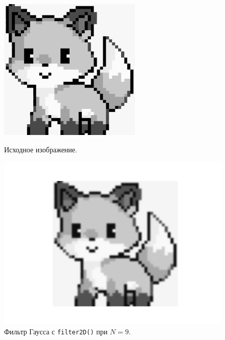 \documentclass[a4paper]{article}
\begin{document}
\begin{figure}[H]
  \centering
  \begin{minipage}{0.49\textwidth}
    \centering
    \includegraphics[width=\textwidth]{src/grayscale.png}
    \caption{Исходное изображение.}  
  \end{minipage}
  \begin{minipage}{0.49\textwidth}
    \centering
    \includegraphics[width=\textwidth]{src/gauss_9.png}
    \caption{Фильтр Гаусса с \texttt{filter2D()} при $N=9$.}
  \end{minipage}
\end{figure}
\end{document}
